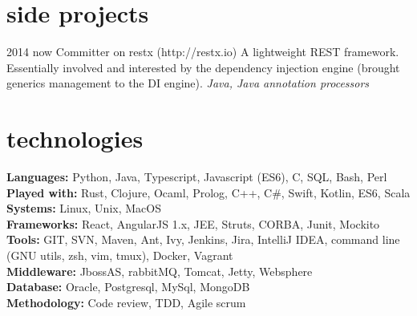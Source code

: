 \documentclass[]{k-cv} %
\begin{document}





\section{side projects}

\begin{entrylist}
\entry
{2014 \to now}
{Committer on restx (http://restx.io)}
{}
{A lightweight REST framework.
Essentially involved and interested by the dependency injection engine (brought generics management to the DI engine).
\emph{Java, Java annotation processors}}
\end{entrylist}

\clearpage



\section{technologies}

\begin{freetext}
{
\textbf{Languages:} Python, Java, Typescript, Javascript (ES6), C, SQL, Bash, Perl\\
\textbf{Played with:} Rust, Clojure, Ocaml, Prolog, C++, C\#, Swift, Kotlin, ES6, Scala\\
\textbf{Systems:} Linux, Unix, MacOS\\
\textbf{Frameworks:} React, AngularJS 1.x, JEE, Struts, CORBA, Junit, Mockito\\
\textbf{Tools:} GIT, SVN, Maven, Ant, Ivy, Jenkins, Jira, IntelliJ IDEA, command line (GNU utils, zsh, vim, tmux), Docker, Vagrant\\
\textbf{Middleware:} JbossAS, rabbitMQ, Tomcat, Jetty, Websphere\\
\textbf{Database:} Oracle, Postgresql, MySql, MongoDB\\
\textbf{Methodology:} Code review, TDD, Agile scrum\\
}
\end{freetext}
\end{document}

